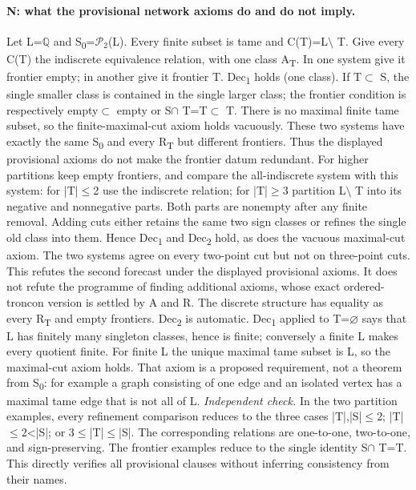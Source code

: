 \paragraph{N: what the provisional network axioms do and do not imply.}\label{lem:networks}
Let L=$\mathbb Q$ and S\textsubscript{0}=$\mathcal P_2$(L). Every finite subset is tame and C(T)=L$\setminus$ T. Give every C(T) the indiscrete equivalence relation, with one class A\textsubscript{T}. In one system give it frontier empty; in another give it frontier T. Dec\textsubscript{1} holds (one class). If T$\subset$ S, the single smaller class is contained in the single larger class; the frontier condition is respectively empty$\subset$ empty or S$\cap$ T=T$\subset$ T. There is no maximal finite tame subset, so the finite-maximal-cut axiom holds vacuously. These two systems have exactly the same S\textsubscript{0} and every R\textsubscript{T} but different frontiers. Thus the displayed provisional axioms do not make the frontier datum redundant.
For higher partitions keep empty frontiers, and compare the all-indiscrete system with this system: for |T|$\leq$2 use the indiscrete relation; for |T|$\geq$3 partition L$\setminus$ T into its negative and nonnegative parts. Both parts are nonempty after any finite removal. Adding cuts either retains the same two sign classes or refines the single old class into them. Hence Dec\textsubscript{1} and Dec\textsubscript{2} hold, as does the vacuous maximal-cut axiom. The two systems agree on every two-point cut but not on three-point cuts. This refutes the second forecast under the displayed provisional axioms. It does not refute the programme of finding additional axioms, whose exact ordered-troncon version is settled by A and R.
The discrete structure has equality as every R\textsubscript{T} and empty frontiers. Dec\textsubscript{2} is automatic. Dec\textsubscript{1} applied to T=$\varnothing$ says that L has finitely many singleton classes, hence is finite; conversely a finite L makes every quotient finite. For finite L the unique maximal tame subset is L, so the maximal-cut axiom holds. That axiom is a proposed requirement, not a theorem from S\textsubscript{0}: for example a graph consisting of one edge and an isolated vertex has a maximal tame edge that is not all of L.
\emph{Independent check.} In the two partition examples, every refinement comparison reduces to the three cases |T|,|S|$\leq$2; |T|$\leq$2<|S|; or 3$\leq$|T|$\leq$|S|. The corresponding relations are one-to-one, two-to-one, and sign-preserving. The frontier examples reduce to the single identity S$\cap$ T=T. This directly verifies all provisional clauses without inferring consistency from their names.

